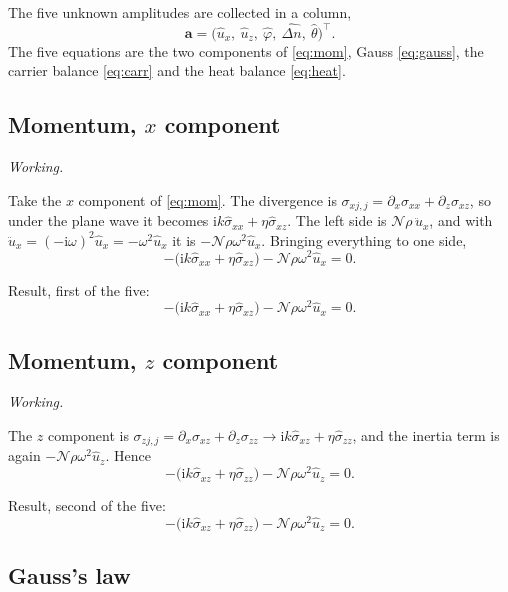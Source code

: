 \documentclass[11pt,a4paper]{article}
\newif\ifshowworked \showworkedtrue
\newenvironment{worked}{\ifshowworked\par\smallskip\noindent\textit{Working.}\par\else\setbox0\vbox\bgroup\fi}{\ifshowworked\par\smallskip\else\egroup\fi}
\newcommand{\Nc}{\mathcal{N}}
\newcommand{\ii}{\mathrm{i}}
\newcommand{\bx}{\hat u_x}
\newcommand{\bz}{\hat u_z}
\newcommand{\bp}{\hat\varphi}
\newcommand{\bn}{\widehat{\Delta n}}
\newcommand{\bt}{\hat\theta}
\begin{document}
The five unknown amplitudes are collected in a column,
\begin{equation}\label{eq:vec}
\mathbf a=\bigl(\bx,\ \bz,\ \bp,\ \bn,\ \bt\bigr)^{\!\top}.
\end{equation}
The five equations are the two components of \eqref{eq:mom}, Gauss \eqref{eq:gauss}, the carrier balance
\eqref{eq:carr} and the heat balance \eqref{eq:heat}.

\subsection{Momentum, $x$ component}

\begin{worked}
Take the $x$ component of \eqref{eq:mom}. The divergence is $\sigma_{xj,j}=\partial_x\sigma_{xx}+\partial_z\sigma_{xz}$,
so under the plane wave it becomes $\ii k\hat\sigma_{xx}+\eta\hat\sigma_{xz}$. The left side is
$\Nc\rho\,\ddot u_x$, and with $\ddot u_x=(-\ii\omega)^2\bx=-\omega^2\bx$ it is $-\Nc\rho\omega^2\bx$.
Bringing everything to one side,
\[
-\bigl(\ii k\hat\sigma_{xx}+\eta\hat\sigma_{xz}\bigr)-\Nc\rho\omega^2\bx=0 .
\]
\end{worked}

\noindent Result, first of the five:
\begin{equation}\label{eq:g1}
-\bigl(\ii k\hat\sigma_{xx}+\eta\hat\sigma_{xz}\bigr)-\Nc\rho\omega^2\bx=0 .
\end{equation}

\subsection{Momentum, $z$ component}

\begin{worked}
The $z$ component is $\sigma_{zj,j}=\partial_x\sigma_{xz}+\partial_z\sigma_{zz}\to\ii k\hat\sigma_{xz}+\eta\hat\sigma_{zz}$,
and the inertia term is again $-\Nc\rho\omega^2\bz$. Hence
\[
-\bigl(\ii k\hat\sigma_{xz}+\eta\hat\sigma_{zz}\bigr)-\Nc\rho\omega^2\bz=0 .
\]
\end{worked}

\noindent Result, second of the five:
\begin{equation}\label{eq:g2}
-\bigl(\ii k\hat\sigma_{xz}+\eta\hat\sigma_{zz}\bigr)-\Nc\rho\omega^2\bz=0 .
\end{equation}

\subsection{Gauss's law}
\end{document}
